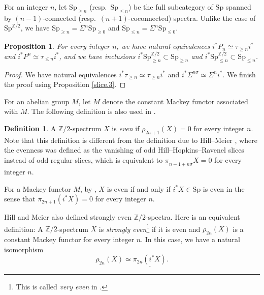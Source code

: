 \documentclass[10pt]{amsart}
\newtheorem{prop}[thm]{Proposition}
\theoremstyle{definition}
\newtheorem{df}[thm]{Definition}
\numberwithin{equation}{section}
\newcommand{\Z}{\mathbb{Z}}
\newcommand{\ul}{\underline}
\newcommand{\Sp}{\mathrm{Sp}}
\begin{document}
{For an integer $n$,
let $\Sp_{\geq n}$ (resp.\ $\Sp_{\leq n}$) be the full subcategory of $\Sp$ spanned by $(n-1)$-connected (resp.\ $(n+1)$-coconnected) spectra.
Unlike the case of $\Sp^{\Z/2}$,
we have $\Sp_{\geq n}= \Sigma^n \Sp_{\geq 0}$ and $\Sp_{\leq n}= \Sigma^n \Sp_{\leq 0}$.

\begin{prop}
\label{slice.5}
For every integer $n$,
we have natural equivalences $i^*P_n\simeq \tau_{\geq n}i^*$ and $i^*P^n\simeq \tau_{\leq n}i^*$,
and we have inclusions $i^*\Sp_{\geq n}^{\Z/2}\subset \Sp_{\geq n}$ and $i^*\Sp_{\leq n}^{\Z/2}\subset \Sp_{\leq n}$.
\end{prop}
\begin{proof}
We have natural equivalences $i^*\tau_{\geq n}\simeq \tau_{\geq n} i^*$ and $i^*\Sigma^{n\sigma}\simeq \Sigma^n i^*$.
We finish the proof using Proposition \ref{slice.3}.
\end{proof}

For an abelian group $M$,
let $\ul{M}$ denote the constant Mackey functor associated with $M$.
The following definition is also used in \cite{HP}.


\begin{df}\label{def:even}
A $\Z/2$-spectrum $X$ is \emph{even} if $\rho_{2n+1}(X)=0$ for every integer $n$.
Note that this definition is different from the definition due to Hill--Meier \cite[Definition 3.1]{HM17},
where the evenness was defined as the vanishing of odd Hill--Hopkins--Ravenel slices instead of odd regular slices,
which is equivalent to $\ul{\pi}_{n-1+n\sigma} X=0$ for every integer $n$.

For a Mackey functor $M$,
by \cite[Proposition 3.10]{HP},
$X$ is even if and only if $i^*X\in \Sp$ is even in the sense that $\pi_{2n+1}(i^*X)=0$ for every integer $n$.

Hill and Meier \cite[Definition 3.1]{HM17} also defined strongly even $\Z/2$-spectra.
Here is an equivalent definition:
A $\Z/2$-spectrum $X$ is \emph{strongly even}\footnote{This is called \emph{very even} in \cite{HP}.} if it is even and $\rho_{2n}(X)$ is a constant Mackey functor for every integer $n$.
In this case,
we have a natural isomorphism
\begin{equation}
\label{eq:very even}
\rho_{2n}(X)\simeq \ul{\pi_{2n}(i^* X)}.
\end{equation}
\end{df}


}
\end{document}
